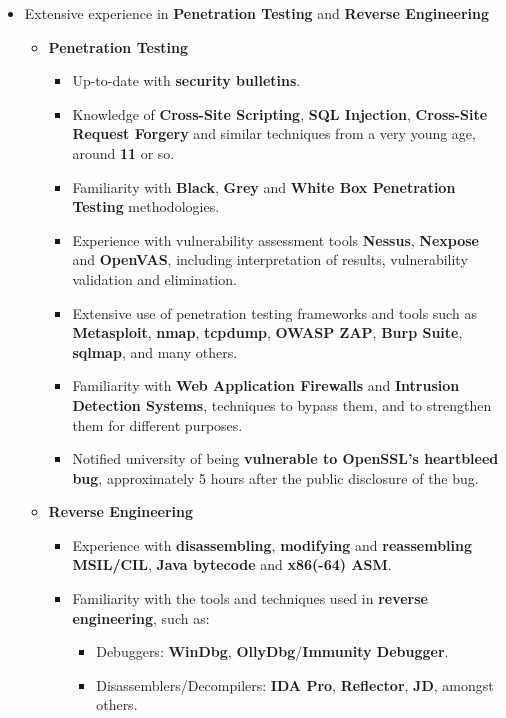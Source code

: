 \documentclass[11pt,a4paper,sans]{moderncv}
\begin{document}
	\begin{itemize}
	\item	\label{pentest}  Extensive experience in\textbf{ Penetration Testing} and \textbf{Reverse Engineering}
		\begin{itemize}
		\item	\textbf{Penetration Testing}
			\begin{itemize}
			\item	Up-to-date with \textbf{security bulletins}.
			\item	Knowledge of \textbf{Cross-Site Scripting}, \textbf{SQL Injection}, \textbf{Cross-Site Request Forgery} and similar techniques from a very young age, around \textbf{11} or so.
			\item	Familiarity with \textbf{Black}, \textbf{Grey} and \textbf{White Box Penetration Testing} methodologies.
			\item	Experience with vulnerability assessment tools \textbf{Nessus}, \textbf{Nexpose} and \textbf{OpenVAS}, including interpretation of results, vulnerability validation and elimination.
			\item	Extensive use of penetration testing frameworks and tools such as \textbf{Metasploit}, \textbf{nmap}, \textbf{tcpdump}, \textbf{OWASP ZAP}, \textbf{Burp Suite}, \textbf{sqlmap}, and many others.
			\item	Familiarity with \textbf{Web Application Firewalls} and \textbf{Intrusion Detection Systems}, techniques to bypass them, and to strengthen them for different purposes.
			\item	Notified university of being \textbf{vulnerable to OpenSSL's heartbleed bug}, approximately 5 hours after the public disclosure of the bug.
			\end{itemize}
		\item	\textbf{Reverse Engineering}
			\begin{itemize}
			\item	Experience with \textbf{disassembling}, \textbf{modifying} and \textbf{reassembling MSIL/CIL}, \textbf{Java bytecode} and \textbf{x86(-64) ASM}.
			\item	Familiarity with the tools and techniques used in \textbf{reverse engineering}, such as:
				\begin{itemize}
				\item	Debuggers: \textbf{WinDbg}, \textbf{OllyDbg}/\textbf{Immunity Debugger}.
				\item	Disassemblers/Decompilers: \textbf{IDA Pro}, \textbf{Reflector}, \textbf{JD}, amongst others.

\end{itemize}
\end{itemize}
\end{itemize}
\end{itemize}
\end{document}
